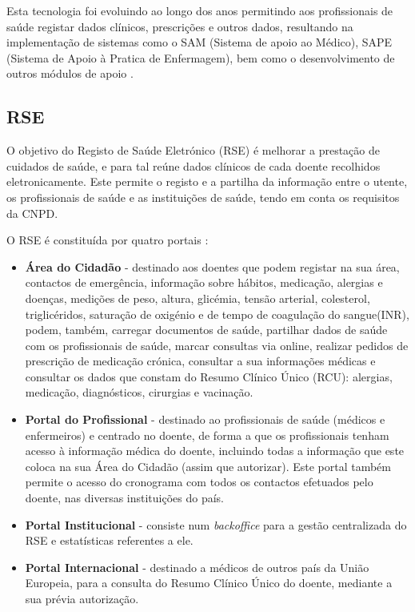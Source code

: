 \documentclass[conference]{IEEEtran}
\begin{document}
Esta tecnologia foi evoluindo ao longo dos anos permitindo aos profissionais de saúde registar dados clínicos, prescrições e outros dados, resultando na implementação de sistemas como o SAM (Sistema de apoio ao Médico), SAPE (Sistema de Apoio à Pratica de Enfermagem), bem como o desenvolvimento de outros módulos de apoio \cite{sinus}.


\subsection{RSE}

O objetivo do Registo de Saúde Eletrónico (RSE) é melhorar a prestação de cuidados de saúde, e para tal reúne dados clínicos de cada doente recolhidos eletronicamente. Este permite o registo e a partilha da informação entre o utente, os profissionais de saúde e as instituições de saúde, tendo em conta os requisitos da CNPD.

O RSE é constituída por quatro portais \cite{rse}:

\begin{itemize}

	\item \textbf{Área do Cidadão} - destinado aos doentes que podem registar na sua área, contactos de emergência, informação sobre hábitos, medicação, alergias e doenças, medições de peso, altura, glicémia, tensão arterial, colesterol, triglicéridos, saturação de oxigénio e de tempo de coagulação do sangue(INR), podem, também, carregar documentos de saúde, partilhar dados de saúde com os profissionais de saúde, marcar consultas via online, realizar pedidos de prescrição de medicação crónica, consultar a sua informações médicas e consultar os dados que constam do Resumo Clínico Único (RCU): alergias, medicação, diagnósticos, cirurgias e vacinação.
	
	\item \textbf{Portal do Profissional} - destinado ao profissionais de saúde (médicos e enfermeiros) e centrado no doente, de forma a que os profissionais tenham acesso à informação médica do doente, incluindo todas a informação que este coloca na sua Área do Cidadão (assim que autorizar). Este portal também permite o acesso do cronograma com todos os contactos efetuados pelo doente, nas diversas instituições do país.
	
	\item \textbf{Portal Institucional} - consiste num \textit{backoffice} para a gestão centralizada do RSE e estatísticas referentes a ele.
	
	\item \textbf{Portal Internacional} - destinado a médicos de outros país da União Europeia, para a consulta do Resumo Clínico Único do doente, mediante a sua prévia autorização.

\end{itemize}
\end{document}
